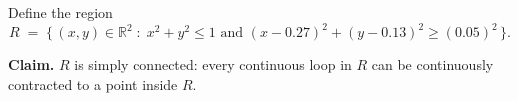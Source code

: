 \begin{problem}
Define the region
\[
  R \;=\; \bigl\{\,(x, y) \in \mathbb{R}^{2} \;:\;
    x^{2} + y^{2} \leq 1
    \text{ and }
    (x - 0.27)^{2} + (y - 0.13)^{2} \geq (0.05)^{2}\,\bigr\}.
\]

\textbf{Claim.} $R$ is simply connected: every continuous loop in $R$
can be continuously contracted to a point inside $R$.
\end{problem}
